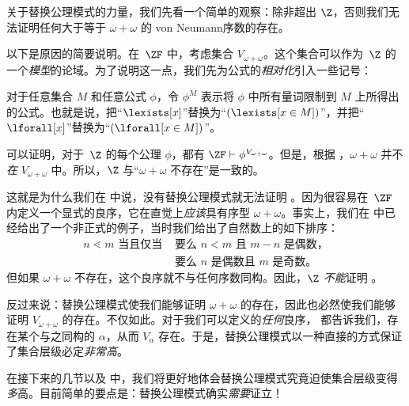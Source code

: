 \documentclass[../../../include/open-logic-section]{subfiles}
\begin{document}

关于替换公理模式的力量，我们先看一个简单的观察：除非超出 $\Z$，否则我们无法证明任何大于等于 $\omega + \omega$ 的 von Neumann序数的存在。

以下是原因的简要说明。在~$\ZF$ 中，考虑集合 $V_{\omega+\omega}$。这个集合可以作为~$\Z$ 的一个\emph{模型}的论域。为了说明这一点，我们先为公式的\emph{相对化}引入一些记号：
\begin{defn}
	对于任意集合 $M$ 和任意公式 $\phi$，令 $\phi^M$ 表示将 $\phi$ 中所有量词限制到 $M$ 上所得出的公式。也就是说，把“$\lexists[x]$”替换为“$(\lexists[x \in M])$”，并把“$\lforall[x]$”替换为“$(\lforall[x \in M])$”。
\end{defn}\noindent
可以证明，对于~$\Z$ 的每个公理 $\phi$，都有 $\ZF \vdash
\phi^{V_{\omega+\omega}}$。但是，根据 ，$\omega+\omega$ 并不\emph{在} $V_{\omega+\omega}$ 中。所以，$\Z$ 与“$\omega+\omega$ 不存在”是一致的。

这就是为什么我们在  中说，没有替换公理模式就无法证明 。因为很容易在~$\ZF$ 内定义一个显式的良序，它在直觉上\emph{应该}具有序型 $\omega+\omega$。事实上，我们在  中已经给出了一个非正式的例子，当时我们给出了自然数上的如下排序：
\begin{align*}
	n \lessdot m \text{ 当且仅当 }&\text{要么 }n < m\text{ 且 }m-n\text{ 是偶数，}\\
	& \text{要么 $n$ 是偶数且 $m$ 是奇数。}
\end{align*}
但如果 $\omega+\omega$ 不存在，这个良序就不与任何序数同构。因此，$\Z$ \emph{不能}证明 。

反过来说：替换公理模式使我们能够证明 $\omega+\omega$ 的存在，因此也必然使我们能够证明 $V_{\omega+\omega}$ 的存在。不仅如此。对于我们可以定义的\emph{任何}良序， 都告诉我们，存在某个与之同构的 $\alpha$，从而 $V_\alpha$ 存在。于是，替换公理模式以一种直接的方式保证了集合层级必定\emph{非常高}。

在接下来的几节以及  中，我们将更好地体会替换公理模式究竟迫使集合层级变得\emph{多}高。目前简单的要点是：替换公理模式确实\emph{需要}证立！
\end{document}
